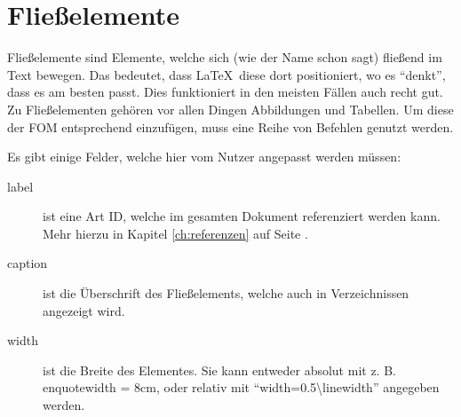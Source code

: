 
\chapter{Fließelemente}\label{ch:fliesselemente}

Fließelemente sind Elemente, welche sich (wie der Name schon sagt) fließend im Text bewegen. Das bedeutet, dass \LaTeX\ diese dort positioniert, wo es \enquote{denkt}, dass es am besten passt. Dies funktioniert in den meisten Fällen auch recht gut.
Zu Fließelementen gehören vor allen Dingen Abbildungen und Tabellen. 
Um diese der FOM entsprechend einzufügen, muss eine Reihe von Befehlen genutzt werden.

Es gibt einige Felder, welche hier vom Nutzer angepasst werden müssen:

\begin{description}
\item[label]
ist eine Art ID, welche im gesamten Dokument referenziert werden kann. Mehr hierzu in Kapitel \ref{ch:referenzen} auf Seite \pageref{ch:referenzen}.
\item[caption] ist die Überschrift des Fließelements, welche auch in Verzeichnissen angezeigt wird.
\item[width] ist die Breite des Elementes. Sie kann entweder absolut mit z. B. enquote{width = 8cm}, oder relativ mit \enquote{width=0.5\textbackslash linewidth} angegeben werden.
\end{description}

